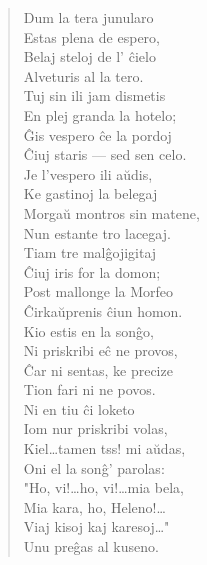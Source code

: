 \begin{verse}
\asterism{}

                        Dum la tera junularo\\
                        Estas plena de espero,\\
                        Belaj steloj de l' \^cielo\\
                        Alveturis al la tero.\\
                        Tuj sin ili jam dismetis\\
                        En plej granda la hotelo;\\
                        \^Gis vespero \^ce la pordoj\\
                        \^Ciuj staris --- sed sen celo.\\
                        Je l'vespero ili a\u udis,\\
                        Ke gastinoj la belegaj\\
                        Morga\u u montros sin matene,\\
                        Nun estante tro lacegaj.\\
                        Tiam tre mal\^gojigitaj\\
                        \^Ciuj iris for la domon;\\
                        Post mallonge la Morfeo\\
                        \^Cirka\u uprenis \^ciun homon.\\
                        Kio estis en la son\^go,\\
                        Ni priskribi e\^c ne provos,\\
                        \^Car ni sentas, ke precize\\
                        Tion fari ni ne povos.\\
                        Ni en tiu \^ci loketo\\
                        Iom nur priskribi volas,\\
                        Kiel\dots tamen tss! mi a\u udas,\\
                        Oni el la son\^g' parolas:\\
                        "Ho, vi!\dots ho, vi!\dots mia bela,\\
                        Mia kara, ho, Heleno!\dots\\
                        Viaj kisoj kaj karesoj\dots"\\
                        Unu pre\^gas al kuseno.\\

\end{verse}
